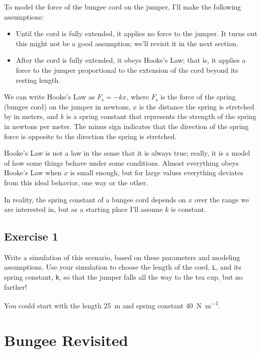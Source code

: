 To model the force of the bungee cord on the jumper, I'll make the following assumptions:

\begin{itemize}

\item Until the cord is fully extended, it applies no force to the jumper.  It turns out this might not be a good assumption; we'll revisit it in the next section.

\item After the cord is fully extended, it obeys Hooke's Law; that is, it applies a force to the jumper proportional to the extension of the cord beyond its resting length.

\end{itemize}

We can write Hooke's Law as
%
$F_\mathrm{s} = -k x$,
%
where $F_\mathrm{s}$ is the force of the spring (bungee cord) on the jumper in newtons, $x$ is the distance the spring is stretched by in meters, and $k$ is a spring constant that represents the strength of the spring in newtons per meter.
The minus sign indicates that the direction of the spring force is opposite to the direction the spring is stretched.


Hooke's Law is not a law in the sense that it is always true; really, it is a model of how some things behave under some conditions.
Almost everything obeys Hooke's Law when $x$ is small enough, but for large values everything deviates from this ideal behavior, one way or the other.

In reality, the spring constant of a bungee cord depends on $x$ over the range we are interested in, but as a starting place I'll assume $k$ is constant.


\subsection{Exercise 1}

Write a simulation of this scenario, based on these parameters and modeling assumptions.
Use your simulation to choose the length of the cord, \lstinline{L}, and its spring constant, \lstinline{k}, so that the jumper falls all the way to the tea cup, but no farther!

You could start with the length \SI{25}{\meter} and spring constant \SI{40}{\newton \per \meter}.


\section{Bungee Revisited}


